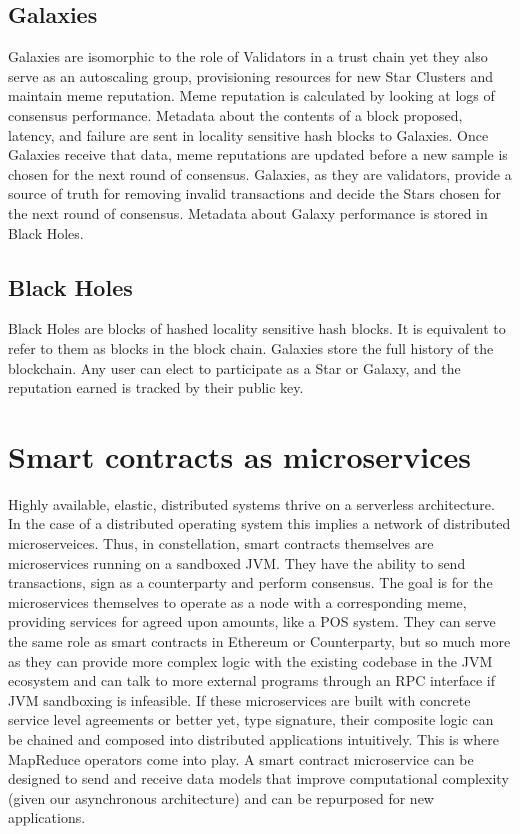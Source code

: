 \documentclass{article}
\begin{document}
\subsection{Galaxies}
Galaxies are isomorphic to the role of Validators in a trust chain yet they also serve as an autoscaling group, provisioning resources for new Star Clusters and maintain meme reputation. Meme reputation is calculated by looking at logs of consensus performance. Metadata about the contents of a block proposed, latency, and failure are sent in locality sensitive hash blocks to Galaxies. Once Galaxies receive that data, meme reputations are updated before a new sample is chosen for the next round of consensus. Galaxies, as they are validators, provide a source of truth for removing invalid transactions and decide the Stars chosen for the next round of consensus. Metadata about Galaxy performance is stored in Black Holes.

\subsection{Black Holes}
Black Holes are blocks of hashed locality sensitive hash blocks. It is equivalent to refer to them as blocks in the block chain. Galaxies store the full history of the blockchain. Any user can elect to participate as a Star or Galaxy, and the reputation earned is tracked by their public key.

\section{Smart contracts as microservices}
Highly available, elastic, distributed systems thrive on a serverless architecture. In the case of a distributed operating system this implies a network of distributed microserveices. Thus, in constellation, smart contracts themselves are microservices running on a sandboxed JVM. They have the ability to send transactions, sign as a counterparty and perform consensus. The goal is for the microservices themselves to operate as a node with a corresponding meme, providing services for agreed upon amounts, like a POS system. They can serve the same role as smart contracts in Ethereum or Counterparty, but so much more as they can provide more complex logic with the existing codebase in the JVM ecosystem and can talk to more external programs through an RPC interface if JVM sandboxing is infeasible. If these microservices are built with concrete service level agreements or better yet, type signature, their composite logic can be chained and composed into distributed applications intuitively. This is where MapReduce operators come into play. A smart contract microservice can be designed to send and receive data models that improve computational complexity (given our asynchronous architecture) and can be repurposed for new applications. 
\end{document}
